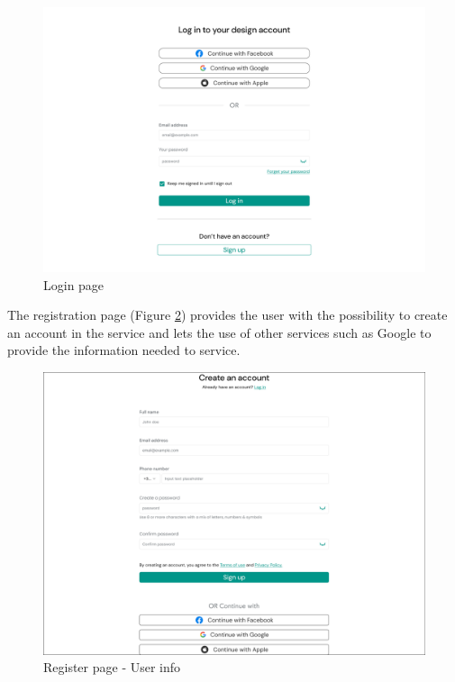 \begin{figure}[H]
    \centering
    \includegraphics[width=18cm]{"images/figmaUI/login-crop.png"}
    \caption{Login page}
    \label{login}
\end{figure}

\newpage
The registration page (Figure \ref{register}) provides the user with the possibility to create an account in the service and lets the use of other services such as Google to provide the information needed to service. 


\begin{figure}[H]
    \centering
    \includegraphics[width=18cm]{"images/figmaUI/register1-crop.png"}
    \caption{Register page - User info}
    \label{register}
\end{figure}

